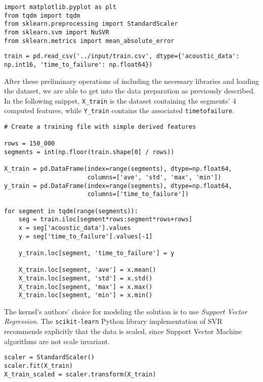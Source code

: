 \begin{lstlisting}[firstnumber=15]
import matplotlib.pyplot as plt
from tqdm import tqdm
from sklearn.preprocessing import StandardScaler
from sklearn.svm import NuSVR
from sklearn.metrics import mean_absolute_error
\end{lstlisting}

\begin{lstlisting}[firstnumber=20]
train = pd.read_csv('../input/train.csv', dtype={'acoustic_data': np.int16, 'time_to_failure': np.float64})
\end{lstlisting}

After these preliminary operations of including the necessary libraries and loading the dataset, we are able to get into the data preparation as previously described. In the following snippet, \texttt{X\_train} is the dataset containing the segments' 4 computed features, while \texttt{Y\_train} contains the associated \texttt{time\textunderscore to\textunderscore failure}.

\begin{lstlisting}[firstnumber=21]
# Create a training file with simple derived features

rows = 150_000
segments = int(np.floor(train.shape[0] / rows))

X_train = pd.DataFrame(index=range(segments), dtype=np.float64,
                       columns=['ave', 'std', 'max', 'min'])
y_train = pd.DataFrame(index=range(segments), dtype=np.float64,
                       columns=['time_to_failure'])

for segment in tqdm(range(segments)):
    seg = train.iloc[segment*rows:segment*rows+rows]
    x = seg['acoustic_data'].values
    y = seg['time_to_failure'].values[-1]
    
    y_train.loc[segment, 'time_to_failure'] = y
    
    X_train.loc[segment, 'ave'] = x.mean()
    X_train.loc[segment, 'std'] = x.std()
    X_train.loc[segment, 'max'] = x.max()
    X_train.loc[segment, 'min'] = x.min()
\end{lstlisting}

The kernel's authors' choice for modeling the solution is to use \textit{Support Vector Regression}. The \texttt{scikit-learn} Python library implementation of SVR recommends explicitly that the data is scaled, since Support Vector Machine algorithms are not scale invariant.

\begin{lstlisting}[firstnumber=42]
scaler = StandardScaler()
scaler.fit(X_train)
X_train_scaled = scaler.transform(X_train)
\end{lstlisting}

